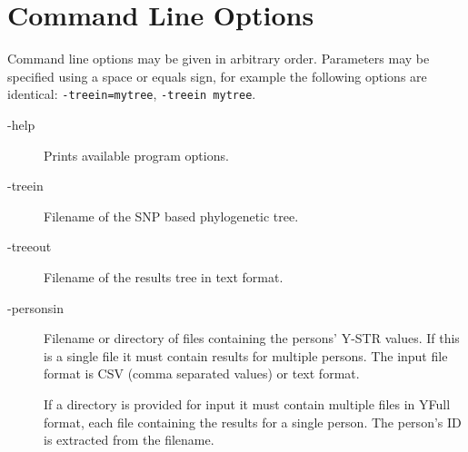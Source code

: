 \section{Command Line Options}

Command line options may be given in arbitrary order.
Parameters may be specified using a space or equals sign,
for example the following options are identical:
\texttt{-treein=mytree}, \texttt{-treein mytree}.

\begin{description}
\item[-help] Prints available program options.

\item[-treein] Filename of the SNP based phylogenetic tree.
\item[-treeout] Filename of the results tree in text format.
\item[-personsin] Filename or directory of files containing the
	persons' Y-STR values. If this is a single file it must contain
	results for multiple persons. The input file format is CSV
    (comma separated values) or text format.

	If a directory is provided for input it must contain multiple
	files in YFull format, each file containing the results for
	a single person. The person's ID is extracted from the filename.


\end{description}
